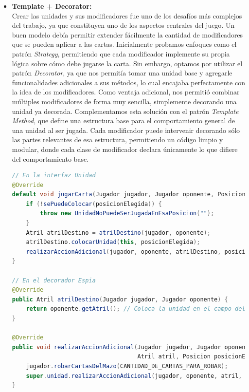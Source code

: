 \documentclass[titlepage,a4paper]{article}
\begin{document}
\begin{itemize}
		\item \textbf{Template + Decorator:} \\
		Crear las unidades y sus modificadores fue uno de los desafíos más complejos del trabajo, ya que constituyen uno de los aspectos centrales del juego. Un buen modelo debía permitir extender fácilmente la cantidad de modificadores que se pueden aplicar a las cartas.
		Inicialmente probamos enfoques como el patrón \textit{Strategy}, permitiendo que cada modificador implemente su propia lógica sobre cómo debe jugarse la carta. Sin embargo, optamos por utilizar el patrón \textit{Decorator}, ya que nos permitía tomar una unidad base y agregarle funcionalidades adicionales a sus métodos, lo cual encajaba perfectamente con la idea de los modificadores. Como ventaja adicional, nos permitió combinar múltiples modificadores de forma muy sencilla, simplemente decorando una unidad ya decorada.
		Complementamos esta solución con el patrón \textit{Template Method}, que define una estructura base para el comportamiento general de una unidad al ser jugada. Cada modificador puede intervenir decorando sólo las partes relevantes de esa estructura, permitiendo un código limpio y modular, donde cada clase de modificador declara únicamente lo que difiere del comportamiento base.





		\begin{lstlisting}[language=Java, caption={Ejemplo de patrón Template + Decorator en una carta con modificador Espia}]
// En la interfaz Unidad
@Override
default void jugarCarta(Jugador jugador, Jugador oponente, Posicion posicionElegida) {
    if (!sePuedeColocar(posicionElegida)) {
        throw new UnidadNoPuedeSerJugadaEnEsaPosicion("");
    }
    Atril atrilDestino = atrilDestino(jugador, oponente);
    atrilDestino.colocarUnidad(this, posicionElegida);
    realizarAccionAdicional(jugador, oponente, atrilDestino, posicionElegida);
}

// En el decorador Espia
@Override
public Atril atrilDestino(Jugador jugador, Jugador oponente) {
    return oponente.getAtril(); // Coloca la unidad en el campo del oponente
}

@Override
public void realizarAccionAdicional(Jugador jugador, Jugador oponente,
                                    Atril atril, Posicion posicionElegida) {
    jugador.robarCartasDelMazo(CANTIDAD_DE_CARTAS_PARA_ROBAR);
    super.unidad.realizarAccionAdicional(jugador, oponente, atril, posicionElegida);
}
		\end{lstlisting}


\end{itemize}
\end{document}
